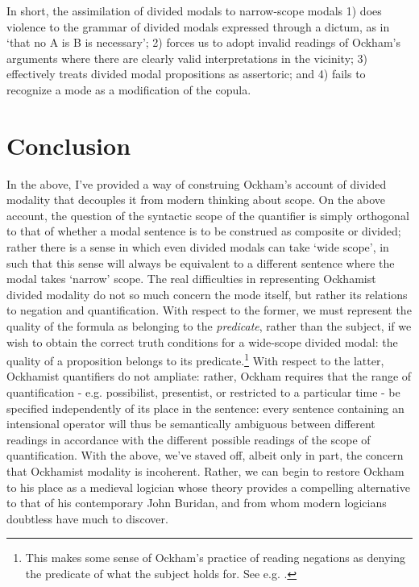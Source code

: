 \documentclass[a4paper]{article}
\begin{document}
In short, the assimilation of divided modals to narrow-scope modals 1) does violence to the grammar of divided modals expressed through a dictum, as in `that no A is B is necessary'; 2) forces us to adopt invalid readings of Ockham's arguments where there are clearly valid interpretations in the vicinity; 3) effectively treats divided modal propositions as assertoric; and 4) fails to recognize a mode as a modification of the copula.
\section{Conclusion}
In the above, I've provided a way of construing Ockham's account of divided modality that decouples it from modern thinking about scope. On the above account, the question of the syntactic scope of the quantifier is simply orthogonal to that of whether a modal sentence is to be construed as composite or divided; rather there is a sense in which even divided modals can take `wide scope', in such that this sense will always be equivalent to a different sentence where the modal takes `narrow' scope. The real difficulties in representing Ockhamist divided modality do not so much concern the mode itself, but rather its relations to negation and quantification. With respect to the former, we must represent the quality of the formula as belonging to the \textit{predicate}, rather than the subject, if we wish to obtain the correct truth conditions for a wide-scope divided modal: the quality of a proposition belongs to its predicate.\footnote{This makes some sense of Ockham's practice of reading negations as denying the predicate of what the subject holds for. See e.g. \cite[II. 2; 5]{OckhamSL2}.} With respect to the latter, Ockhamist quantifiers do not ampliate: rather, Ockham requires that the range of quantification - e.g. possibilist, presentist, or restricted to a particular time - be specified independently of its place in the sentence: every sentence containing an intensional operator will thus be semantically ambiguous between different readings in accordance with the different possible readings of the scope of quantification. With the above, we've staved off, albeit only in part, the concern that Ockhamist modality is incoherent. Rather, we can begin to restore Ockham to his place as a medieval logician whose theory provides a compelling alternative to that of his contemporary John Buridan, and from whom modern logicians doubtless have much to discover. 

\printbibliography 
\end{document}
